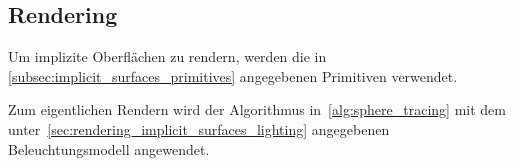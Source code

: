 
\subsection{Rendering}
\label{sec:rendering_implicit_surfaces_Rendering}

Um implizite Oberflächen zu rendern, werden die in
\autoref{subsec:implicit_surfaces_primitives} angegebenen
Primitiven verwendet.

Zum eigentlichen Rendern wird der Algorithmus
in~\autoref{alg:sphere_tracing} mit dem
unter~\autoref{sec:rendering_implicit_surfaces_lighting} angegebenen
Beleuchtungsmodell angewendet.
